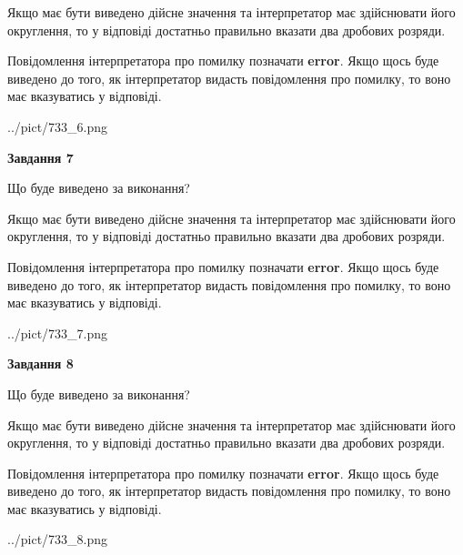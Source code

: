 \documentclass[12pt, ukrainian]{article}
\begin{document}
{\begin {Large}
Якщо має бути виведено дійсне значення та інтерпретатор має здійснювати його округлення, 
то у відповіді достатньо правильно вказати два дробових розряди.

Повідомлення інтерпретатора про помилку позначати \textbf{error}.
Якщо щось буде виведено до того, як інтерпретатор видасть повідомлення про помилку, 
то воно має вказуватись у відповіді. \par

\begin{center}
	{../pict/733_6.png}
\end{center}
\newpage

{\begin {center}\textbf{Завдання 7}\end {center}}\par
Що буде виведено за виконання? \par

Якщо має бути виведено дійсне значення та інтерпретатор має здійснювати його округлення, 
то у відповіді достатньо правильно вказати два дробових розряди.

Повідомлення інтерпретатора про помилку позначати \textbf{error}.
Якщо щось буде виведено до того, як інтерпретатор видасть повідомлення про помилку, 
то воно має вказуватись у відповіді. \par

\begin{center}
	{../pict/733_7.png}
\end{center}
\newpage

{\begin {center}\textbf{Завдання 8}\end {center}}\par
Що буде виведено за виконання? \par

Якщо має бути виведено дійсне значення та інтерпретатор має здійснювати його округлення, 
то у відповіді достатньо правильно вказати два дробових розряди.

Повідомлення інтерпретатора про помилку позначати \textbf{error}.
Якщо щось буде виведено до того, як інтерпретатор видасть повідомлення про помилку, 
то воно має вказуватись у відповіді. \par

\begin{center}
	{../pict/733_8.png}
\end{center}
\newpage


\end{Large}}
\end{document}
